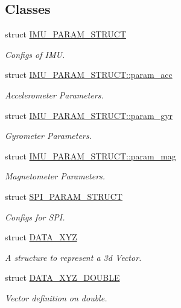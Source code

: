 \subsection*{Classes}
\begin{DoxyCompactItemize}
\item 
struct \hyperlink{structIMU__PARAM__STRUCT}{I\-M\-U\-\_\-\-P\-A\-R\-A\-M\-\_\-\-S\-T\-R\-U\-C\-T}
\begin{DoxyCompactList}\small\item\em Configs of I\-M\-U. \end{DoxyCompactList}\item 
struct \hyperlink{structIMU__PARAM__STRUCT_1_1param__acc}{I\-M\-U\-\_\-\-P\-A\-R\-A\-M\-\_\-\-S\-T\-R\-U\-C\-T\-::param\-\_\-acc}
\begin{DoxyCompactList}\small\item\em Accelerometer Parameters. \end{DoxyCompactList}\item 
struct \hyperlink{structIMU__PARAM__STRUCT_1_1param__gyr}{I\-M\-U\-\_\-\-P\-A\-R\-A\-M\-\_\-\-S\-T\-R\-U\-C\-T\-::param\-\_\-gyr}
\begin{DoxyCompactList}\small\item\em Gyrometer Parameters. \end{DoxyCompactList}\item 
struct \hyperlink{structIMU__PARAM__STRUCT_1_1param__mag}{I\-M\-U\-\_\-\-P\-A\-R\-A\-M\-\_\-\-S\-T\-R\-U\-C\-T\-::param\-\_\-mag}
\begin{DoxyCompactList}\small\item\em Magnetometer Parameters. \end{DoxyCompactList}\item 
struct \hyperlink{structSPI__PARAM__STRUCT}{S\-P\-I\-\_\-\-P\-A\-R\-A\-M\-\_\-\-S\-T\-R\-U\-C\-T}
\begin{DoxyCompactList}\small\item\em Configs for S\-P\-I. \end{DoxyCompactList}\item 
struct \hyperlink{structDATA__XYZ}{D\-A\-T\-A\-\_\-\-X\-Y\-Z}
\begin{DoxyCompactList}\small\item\em A structure to represent a 3d Vector. \end{DoxyCompactList}\item 
struct \hyperlink{structDATA__XYZ__DOUBLE}{D\-A\-T\-A\-\_\-\-X\-Y\-Z\-\_\-\-D\-O\-U\-B\-L\-E}
\begin{DoxyCompactList}\small\item\em Vector definition on double. \end{DoxyCompactList}\item 

\end{DoxyCompactItemize}
